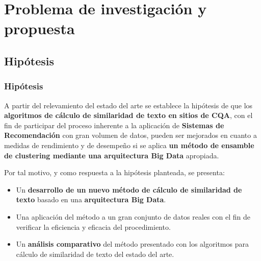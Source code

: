 \section{Problema de investigación y propuesta}

\subsection{Hipótesis}
\begin{frame}[allowframebreaks]
	\frametitle{Hipótesis}
	\begin{tcolorbox}[colback=blue!5,colframe=blue!40!black,title=Hipótesis del trabajo de tesis]
		A partir del relevamiento del estado del arte se establece la hipótesis de que los \textbf{algoritmos de cálculo de similaridad de texto en sitios de CQA}, con el fin de participar del proceso inherente a la aplicación de \textbf{Sistemas de Recomendación} con gran volumen de datos, pueden ser mejorados en cuanto a medidas de rendimiento y de desempeño si se aplica \textbf{un método de ensamble de clustering mediante una arquitectura Big Data} apropiada.
	\end{tcolorbox}

	\framebreak

	\begin{tcolorbox}[colback=blue!5,colframe=blue!40!black,title=Hipótesis del trabajo de tesis (cont.)]
		\bigskip Por tal motivo, y como respuesta a la hipótesis planteada, se presenta:
		\begin{itemize}[<*>]
			\item Un \textbf{desarrollo de un nuevo método de cálculo de similaridad de texto} basado en una \textbf{arquitectura Big Data}.
			\item Una aplicación del método a un gran conjunto de datos reales con el fin de verificar la eficiencia y eficacia del procedimiento.
			\item Un \textbf{análisis comparativo} del método presentado con los algoritmos para cálculo de similaridad de texto del estado del arte.
		\end{itemize}
	\end{tcolorbox}
\end{frame}

